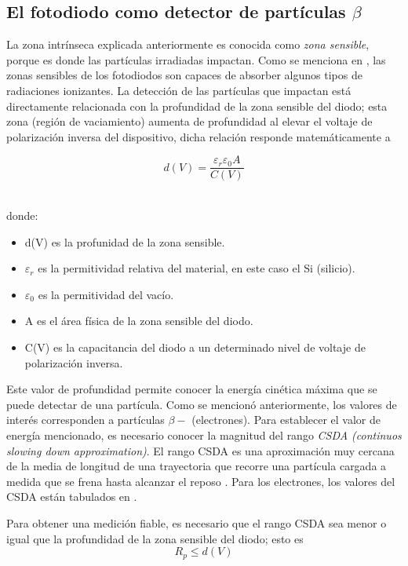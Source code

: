 \documentclass[a4paper,conference]{IEEEtran}
\begin{document}
    \subsection{El fotodiodo como detector de partículas $\beta$}
        La zona intrínseca explicada anteriormente es conocida como \emph{zona
        sensible}, porque es donde las partículas irradiadas impactan. Como se
        menciona en \cite{mpdi}, las zonas sensibles de los fotodiodos son
        capaces de absorber algunos tipos de radiaciones ionizantes. La
        detección de las partículas que impactan está directamente relacionada
        con la profundidad de la zona sensible del diodo; esta zona (región de
        vaciamiento) aumenta de profundidad al elevar el voltaje de polarización
        inversa del dispositivo, dicha relación responde matemáticamente a

        \begin{equation}
            \label{d_x}
            d(V) = \frac{\varepsilon_{r}\varepsilon_{0}A}{C(V)}
        \end{equation}

        \hfill \\ donde:
        \begin{itemize}
            \item d(V) es la profunidad de la zona sensible.
            \item $\varepsilon_{r}$ es la permitividad relativa del material, en este caso el Si
                (silicio).
            \item $\varepsilon_{0}$ es la permitividad del vacío.
            \item A es el área física de la zona sensible del diodo.
            \item C(V) es la capacitancia del diodo a un determinado nivel de
                voltaje de polarización inversa.
        \end{itemize}

        Este valor de profundidad permite conocer la energía cinética máxima que
        se puede detectar de una partícula. Como se mencionó anteriormente, los
        valores de interés corresponden a partículas $\beta-$ (electrones). Para
        establecer el valor de energía mencionado, es necesario conocer la
        magnitud del rango \emph{CSDA (continuos slowing down approximation)}.
        El rango CSDA es una aproximación muy cercana de la media de longitud de
        una trayectoria que recorre una partícula cargada a medida que se frena
        hasta alcanzar el reposo \cite{nist}. Para los electrones, los valores
        del CSDA están tabulados en \cite{nist}.\par 
        Para obtener una medición fiable, es necesario que el rango CSDA sea
        menor o igual que la profundidad de la zona sensible del diodo; esto es
        \begin{equation}
            R_{p} \leq d(V)
            \label{eq:range}
        \end{equation}
\end{document}
